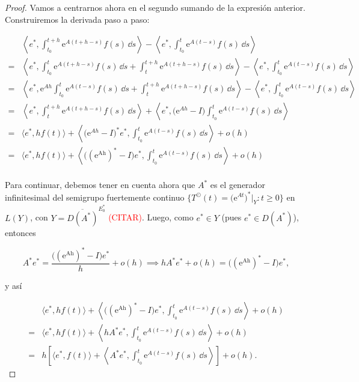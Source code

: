 \begin{proof}
    Vamos a centrarnos ahora en el segundo sumando de la expresión anterior. Construiremos la derivada paso a paso:

    \begin{align*}
        &\left \langle e^*, \int_{t_0}^{t + h}\mathrm{e}^{A(t + h - s)}f(s) \, \dd s \right \rangle - \left \langle e^*, \int_{t_0}^{t}\mathrm{e}^{A(t - s)}f(s) \, \dd s \right \rangle\\
        =& \left \langle e^*, \int_{t_0}^{t}\mathrm{e}^{A(t + h - s)}f(s) \, \dd s + \int_{t}^{t + h}\mathrm{e}^{A(t + h - s)}f(s) \, \dd s \right \rangle - \left \langle e^*, \int_{t_0}^{t}\mathrm{e}^{A(t - s)}f(s) \, \dd s \right \rangle\\
        =& \left \langle e^*, \mathrm{e}^{Ah}\int_{t_0}^{t}\mathrm{e}^{A(t - s)}f(s) \, \dd s + \int_{t}^{t + h}\mathrm{e}^{A(t + h - s)}f(s) \, \dd s \right \rangle - \left \langle e^*, \int_{t_0}^{t}\mathrm{e}^{A(t - s)}f(s) \, \dd s \right \rangle\\
        =& \left \langle e^*, \int_{t}^{t + h}\mathrm{e}^{A(t + h - s)}f(s) \, \dd s \right \rangle + \left \langle e^*, \big(\mathrm{e}^{Ah} - I \big)\int_{t_0}^{t}\mathrm{e}^{A(t - s)}f(s) \, \dd s \right \rangle\\
        =& \langle e^*, h f(t) \rangle + \left \langle \big(\mathrm{e}^{Ah} - I \big)^* e^*, \int_{t_0}^{t}\mathrm{e}^{A(t - s)}f(s) \, \dd s \right \rangle + o(h)\\
        =& \langle e^*, h f(t) \rangle + \left \langle \Big(\mathrm{(e^{Ah})^*} - I\Big) e^*, \int_{t_0}^{t}\mathrm{e}^{A(t - s)}f(s) \, \dd s \right \rangle + o(h)\\
    \end{align*}

    Para continuar, debemos tener en cuenta ahora que $A^*$ es el generador infinitesimal del semigrupo fuertemente continuo $\{T^\odot (t) = \big(\mathrm{e}^{At}\big)^* |_Y : t \geq 0 \}$ en $L(Y)$, con $Y = \overline{D(A^*)}^{E_0^*}$ \textcolor{red}{(CITAR)}. Luego, como $e^* \in Y$ (pues $e^* \in D(A^*)$), entonces

    \[A^* e^* = \frac{\Big(\mathrm{(e^{Ah})^*} - I\Big) e^*}{h} + o(h) \implies hA^*e^* + o(h) = \Big(\mathrm{(e^{Ah})^*} - I\Big) e^*,\]

    y así

    \begin{align*}
        &\langle e^*, h f(t) \rangle + \left \langle \Big(\mathrm{(e^{Ah})^*} - I\Big) e^*, \int_{t_0}^{t}\mathrm{e}^{A(t - s)}f(s) \, \dd s \right \rangle + o(h)\\
        =&\langle e^*, h f(t) \rangle + \left \langle hA^* e^*, \int_{t_0}^{t}\mathrm{e}^{A(t - s)}f(s) \, \dd s \right \rangle + o(h)\\
        =&h \left[ \langle e^*, f(t) \rangle + \left \langle A^* e^*, \int_{t_0}^{t}\mathrm{e}^{A(t - s)}f(s) \, \dd s \right \rangle \right] + o(h).
    \end{align*}


\end{proof}

